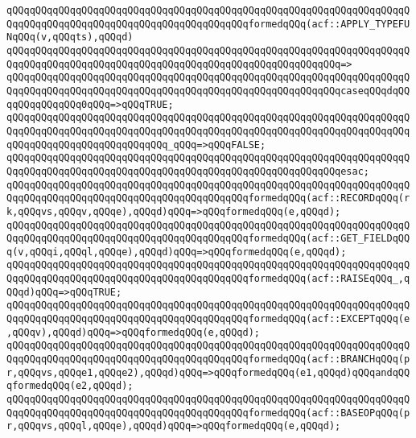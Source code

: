 \newline
\verb|qQQqqQQqqQQqqQQqqQQqqQQqqQQqqQQqqQQqqQQqqQQqqQQqqQQqqQQqqQQqqQQqqQQqqQQqqQQqqQQqqQQqqQQqqQQqqQQqqQQqqQQqqQQqqQQqformedqQQq(acf::APPLY_TYPEFUNqQQq(v,qQQqts),qQQqd)|\newline
\verb|qQQqqQQqqQQqqQQqqQQqqQQqqQQqqQQqqQQqqQQqqQQqqQQqqQQqqQQqqQQqqQQqqQQqqQQqqQQqqQQqqQQqqQQqqQQqqQQqqQQqqQQqqQQqqQQqqQQqqQQqqQQqqQQq=>|\newline
\verb|qQQqqQQqqQQqqQQqqQQqqQQqqQQqqQQqqQQqqQQqqQQqqQQqqQQqqQQqqQQqqQQqqQQqqQQqqQQqqQQqqQQqqQQqqQQqqQQqqQQqqQQqqQQqqQQqqQQqqQQqqQQqqQQqcaseqQQqdqQQqqQQqqQQqqQQq0qQQq=>qQQqTRUE;|\newline
\verb|qQQqqQQqqQQqqQQqqQQqqQQqqQQqqQQqqQQqqQQqqQQqqQQqqQQqqQQqqQQqqQQqqQQqqQQqqQQqqQQqqQQqqQQqqQQqqQQqqQQqqQQqqQQqqQQqqQQqqQQqqQQqqQQqqQQqqQQqqQQqqQQqqQQqqQQqqQQqqQQqqQQqqQQq_qQQq=>qQQqFALSE;|\newline
\verb|qQQqqQQqqQQqqQQqqQQqqQQqqQQqqQQqqQQqqQQqqQQqqQQqqQQqqQQqqQQqqQQqqQQqqQQqqQQqqQQqqQQqqQQqqQQqqQQqqQQqqQQqqQQqqQQqqQQqqQQqqQQqqQQqesac;|\newline
\newline
\verb|qQQqqQQqqQQqqQQqqQQqqQQqqQQqqQQqqQQqqQQqqQQqqQQqqQQqqQQqqQQqqQQqqQQqqQQqqQQqqQQqqQQqqQQqqQQqqQQqqQQqqQQqqQQqqQQqformedqQQq(acf::RECORDqQQq(rk,qQQqvs,qQQqv,qQQqe),qQQqd)qQQq=>qQQqformedqQQq(e,qQQqd);|\newline
\verb|qQQqqQQqqQQqqQQqqQQqqQQqqQQqqQQqqQQqqQQqqQQqqQQqqQQqqQQqqQQqqQQqqQQqqQQqqQQqqQQqqQQqqQQqqQQqqQQqqQQqqQQqqQQqqQQqformedqQQq(acf::GET_FIELDqQQq(v,qQQqi,qQQql,qQQqe),qQQqd)qQQq=>qQQqformedqQQq(e,qQQqd);|\newline
\verb|qQQqqQQqqQQqqQQqqQQqqQQqqQQqqQQqqQQqqQQqqQQqqQQqqQQqqQQqqQQqqQQqqQQqqQQqqQQqqQQqqQQqqQQqqQQqqQQqqQQqqQQqqQQqqQQqformedqQQq(acf::RAISEqQQq_,qQQqd)qQQq=>qQQqTRUE;|\newline
\verb|qQQqqQQqqQQqqQQqqQQqqQQqqQQqqQQqqQQqqQQqqQQqqQQqqQQqqQQqqQQqqQQqqQQqqQQqqQQqqQQqqQQqqQQqqQQqqQQqqQQqqQQqqQQqqQQqformedqQQq(acf::EXCEPTqQQq(e,qQQqv),qQQqd)qQQq=>qQQqformedqQQq(e,qQQqd);|\newline
\verb|qQQqqQQqqQQqqQQqqQQqqQQqqQQqqQQqqQQqqQQqqQQqqQQqqQQqqQQqqQQqqQQqqQQqqQQqqQQqqQQqqQQqqQQqqQQqqQQqqQQqqQQqqQQqqQQqformedqQQq(acf::BRANCHqQQq(pr,qQQqvs,qQQqe1,qQQqe2),qQQqd)qQQq=>qQQqformedqQQq(e1,qQQqd)qQQqandqQQqformedqQQq(e2,qQQqd);|\newline
\verb|qQQqqQQqqQQqqQQqqQQqqQQqqQQqqQQqqQQqqQQqqQQqqQQqqQQqqQQqqQQqqQQqqQQqqQQqqQQqqQQqqQQqqQQqqQQqqQQqqQQqqQQqqQQqqQQqformedqQQq(acf::BASEOPqQQq(pr,qQQqvs,qQQql,qQQqe),qQQqd)qQQq=>qQQqformedqQQq(e,qQQqd);|\newline
